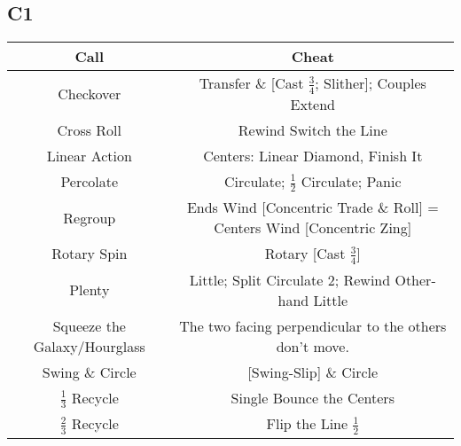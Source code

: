 \documentclass{article}
\begin{document}
\subsection*{C1}
\begin{center}
  \begin{tabular}{c | c}
    Call & Cheat \\ \hline
    Checkover & Transfer \& [Cast $\frac34$; Slither]; Couples Extend \\
    Cross Roll & Rewind Switch the Line \\
    Linear Action & Centers: Linear Diamond, Finish It \\
    Percolate & Circulate; $\frac12$ Circulate; Panic \\
    Regroup & Ends Wind [Concentric Trade \& Roll] = Centers Wind [Concentric Zing] \\
    Rotary Spin & Rotary [Cast $\frac34$] \\
    Plenty & Little; Split Circulate 2; Rewind Other-hand Little \\
    Squeeze the Galaxy/Hourglass & The two facing perpendicular to the others don't move. \\
    Swing \& Circle & [Swing-Slip] \& Circle \\
    $\frac13$ Recycle & Single Bounce the Centers \\
    $\frac23$ Recycle & Flip the Line $\frac12$ \\
  \end{tabular}
\end{center}
\end{document}
